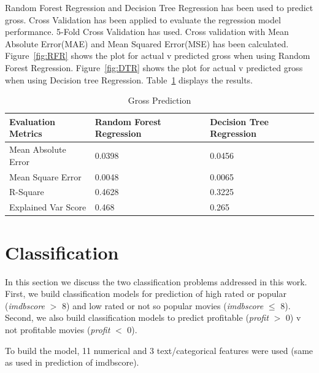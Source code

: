 \documentclass{article}%
\begin{document}
Random Forest Regression and Decision Tree Regression has been used to predict gross. Cross Validation has been applied to evaluate the regression model performance. 5-Fold Cross Validation has used. Cross validation with Mean Absolute Error(MAE) and Mean Squared Error(MSE) has been calculated. Figure~\ref{fig:RFR} shows the plot for actual v predicted gross when using Random Forest Regression. Figure~\ref{fig:DTR} shows the plot for actual v predicted gross when using Decision tree Regression. Table~\ref{tab:gross} displays the results.

\begin{table}[]
\centering
\caption{Gross Prediction}
\label{tab:gross}
\begin{tabular}{|l|l|l|}
\hline
Evaluation Metrics  & Random Forest Regression & Decision Tree Regression \\ \hline
Mean Absolute Error & 0.0398                   & 0.0456                   \\ \hline
Mean Square Error   & 0.0048                   & 0.0065                   \\ \hline
R-Square            & 0.4628                   & 0.3225                   \\ \hline
Explained Var Score & 0.468                    & 0.265                    \\ \hline
\end{tabular}
\end{table}

\section{Classification}

In this section we discuss the two classification problems addressed in this work. First, we build classification models for prediction of high rated or popular (\textit{imdbscore} $>$ 8) and low rated or not so popular movies (\textit{imdbscore} $\leq$ 8). Second, we also build classification models to predict profitable (\textit{profit} $>$ 0) v not profitable movies (\textit{profit} $<$ 0).

To build the model, 11 numerical and 3 text/categorical features were used (same as used in prediction of imdbscore). 
\end{document}
